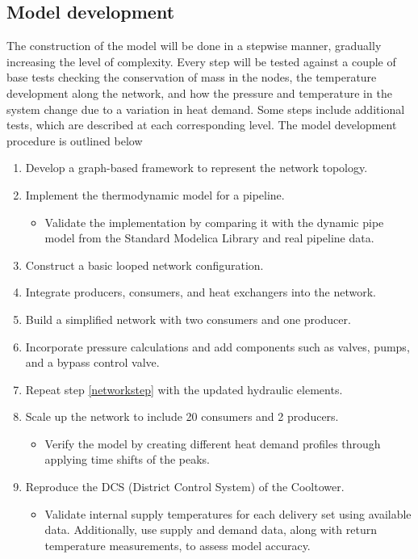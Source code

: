 \subsection{Model development}
The construction of the model will be done in a stepwise manner, gradually increasing the level of complexity. Every step will be tested against a couple of base tests checking the conservation of mass in the nodes, the temperature development along the network, and how the pressure and temperature in the system change due to a variation in heat demand. Some steps include additional tests, which are described at each corresponding level. The model development procedure is outlined below

\begin{enumerate}
\item Develop a graph-based framework to represent the network topology.
\item Implement the thermodynamic model for a pipeline.
\begin{itemize}
\item Validate the implementation by comparing it with the dynamic pipe model from the Standard Modelica Library and real pipeline data.
\end{itemize}
\item Construct a basic looped network configuration.
\item Integrate producers, consumers, and heat exchangers into the network.
\item Build a simplified network with two consumers and one producer. \label{networkstep}
\item Incorporate pressure calculations and add components such as valves, pumps, and a bypass control valve.
\item Repeat step \ref{networkstep} with the updated hydraulic elements.
\item Scale up the network to include 20 consumers and 2 producers.
\begin{itemize}
    \item Verify the model by creating different heat demand profiles through applying time shifts of the peaks. 
\end{itemize}
\item Reproduce the DCS (District Control System) of the Cooltower.
\begin{itemize}
\item Validate internal supply temperatures for each delivery set using available data. Additionally, use supply and demand data, along with return temperature measurements, to assess model accuracy.
\end{itemize}
\end{enumerate}

